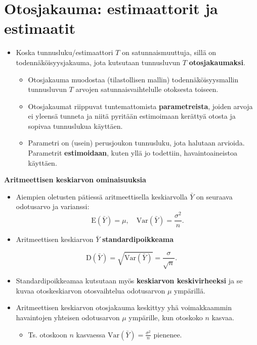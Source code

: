 \documentclass[
]{book}
\providecommand{\tightlist}{%
  \setlength{\itemsep}{0pt}\setlength{\parskip}{0pt}}
\begin{document}
\hypertarget{otosjakauma-estimaattorit-ja-estimaatit}{%
\section{Otosjakauma: estimaattorit ja estimaatit}\label{otosjakauma-estimaattorit-ja-estimaatit}}

\begin{itemize}
\tightlist
\item
  Koska tunnusluku/estimaattori \(T\) on satunnaismuuttuja, sillä on todennäköisyysjakauma, jota kutsutaan tunnusluvun \(T\) \textbf{otosjakaumaksi}.

  \begin{itemize}
  \tightlist
  \item
    Otosjakauma muodostaa (tilastollisen mallin) todennäköisyysmallin tunnusluvun \(T\) arvojen satunnaisvaihtelulle otoksesta toiseen.
  \item
    Otosjakaumat riippuvat tuntemattomista \textbf{parametreista}, joiden arvoja ei yleensä tunneta ja niitä pyritään estimoimaan kerättyä otosta ja sopivaa tunnuslukua käyttäen.
  \item
    Parametri on (usein) perusjoukon tunnusluku, jota halutaan arvioida. Parametrit \textbf{estimoidaan}, kuten yllä jo todettiin, havaintoaineistoa käyttäen.
  \end{itemize}
\end{itemize}

\textbf{Aritmeettisen keskiarvon ominaisuuksia}

\begin{itemize}
\item
  Aiempien oletusten pätiessä aritmeettisella keskiarvolla \(\bar{Y}\) on seuraava odotusarvo ja varianssi:
  \[
  \text{E}(\bar{Y}) = \mu,  \quad
  \mathrm{Var}(\bar{Y}) = \frac{\sigma^2}{n}.
  \]
\item
  Aritmeettisen keskiarvon \(\bar{Y}\) \textbf{standardipoikkeama}
\end{itemize}

\[
\text{D}(\bar{Y}) = \sqrt{\mathrm{Var}(\bar{Y})} = \frac{\sigma}{\sqrt{n}}.
\]

\begin{itemize}
\item
  Standardipoikkeamaa kutsutaan myös \textbf{keskiarvon keskivirheeksi} ja se kuvaa otoskeskiarvon otosvaihtelua odotusarvon \(\mu\) ympärillä.
\item
  Aritmeettisen keskiarvon otosjakauma keskittyy yhä voimakkaammin havaintojen yhteisen odotusarvon \(\mu\) ympärille, kun otoskoko \(n\) kasvaa.

  \begin{itemize}
  \tightlist
  \item
    Ts. otoskoon \(n\) kasvaessa \(\mathrm{Var}(\bar{Y}) = \frac{\sigma^2}{n}\) pienenee.
  \end{itemize}
\end{itemize}
\end{document}
